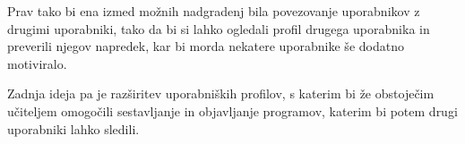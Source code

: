 \documentclass[a4paper, 12pt]{book}
\begin{document}
Prav tako bi ena izmed možnih nadgradenj bila povezovanje uporabnikov z drugimi uporabniki, tako da bi si lahko ogledali profil drugega uporabnika in preverili njegov napredek, kar bi morda nekatere uporabnike še dodatno motiviralo. 

Zadnja ideja pa je razširitev uporabniških profilov, s katerim bi že obstoječim učiteljem omogočili sestavljanje in objavljanje programov, katerim bi potem drugi uporabniki lahko sledili.


\clearpage
{}


\end{document}
